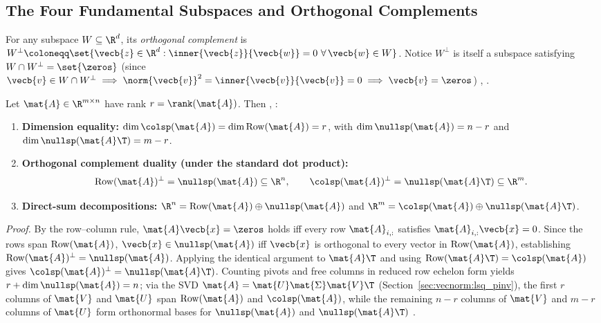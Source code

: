 \documentclass[../../../../master.tex]{subfiles}
\begin{document}
\subsection{The Four Fundamental Subspaces and Orthogonal Complements}

For any subspace $W \subseteq \R^d$, its \emph{orthogonal complement} is $W^\perp \coloneqq \set{\vecb{z} \in \R^d : \inner{\vecb{z}}{\vecb{w}} = 0\ \forall\,\vecb{w} \in W}$. Notice $W^\perp$ is itself a subspace satisfying $W \cap W^\perp = \set{\zeros}$ (since $\vecb{v} \in W \cap W^\perp \implies \norm{\vecb{v}}^2 = \inner{\vecb{v}}{\vecb{v}} = 0 \implies \vecb{v} = \zeros$) , .

\begin{coremath}
Let $\mat{A} \in \R^{m \times n}$ have rank $r = \rank(\mat{A})$. Then , :
\begin{enumerate}[leftmargin=1.4em]
  \item \textbf{Dimension equality:} $\dim\colsp(\mat{A}) = \dim\mathrm{Row}(\mat{A}) = r$, with $\dim\nullsp(\mat{A}) = n - r$ and $\dim\nullsp(\mat{A}\T) = m - r$.
  \item \textbf{Orthogonal complement duality (under the standard dot product):}
  \begin{equation}
    \mathrm{Row}(\mat{A})^\perp = \nullsp(\mat{A}) \subseteq \R^n, \qquad \colsp(\mat{A})^\perp = \nullsp(\mat{A}\T) \subseteq \R^m.
    \label{eq:vecnorm:four_perp}
  \end{equation}
  \item \textbf{Direct-sum decompositions:} $\R^n = \mathrm{Row}(\mat{A}) \oplus \nullsp(\mat{A})$ and $\R^m = \colsp(\mat{A}) \oplus \nullsp(\mat{A}\T)$.
\end{enumerate}

\emph{Proof.} By the row--column rule, $\mat{A}\vecb{x} = \zeros$ holds iff every row $\mat{A}_{i,:}$ satisfies $\mat{A}_{i,:}\vecb{x} = 0$. Since the rows span $\mathrm{Row}(\mat{A})$, $\vecb{x} \in \nullsp(\mat{A})$ iff $\vecb{x}$ is orthogonal to every vector in $\mathrm{Row}(\mat{A})$, establishing $\mathrm{Row}(\mat{A})^\perp = \nullsp(\mat{A})$. Applying the identical argument to $\mat{A}\T$ and using $\mathrm{Row}(\mat{A}\T) = \colsp(\mat{A})$ gives $\colsp(\mat{A})^\perp = \nullsp(\mat{A}\T)$. Counting pivots and free columns in reduced row echelon form yields $r + \dim\nullsp(\mat{A}) = n$; via the SVD $\mat{A} = \mat{U}\mat{\Sigma}\mat{V}\T$ (Section~\ref{sec:vecnorm:lsq_pinv}), the first $r$ columns of $\mat{V}$ and $\mat{U}$ span $\mathrm{Row}(\mat{A})$ and $\colsp(\mat{A})$, while the remaining $n-r$ columns of $\mat{V}$ and $m-r$ columns of $\mat{U}$ form orthonormal bases for $\nullsp(\mat{A})$ and $\nullsp(\mat{A}\T)$ .
\end{coremath}
\end{document}
